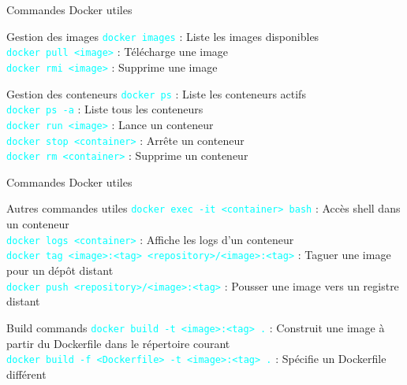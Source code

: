 \documentclass{beamer}
\begin{document}
\begin{frame}[fragile]{Commandes Docker utiles}
\begin{block}{Gestion des images}
\textcolor{cyan}{\verb?docker images?} : Liste les images disponibles \\
\textcolor{cyan}{\verb?docker pull <image>?} : Télécharge une image \\
\textcolor{cyan}{\verb?docker rmi <image>?} : Supprime une image
\end{block}

\begin{block}{Gestion des conteneurs}
\textcolor{cyan}{\verb?docker ps?} : Liste les conteneurs actifs \\
\textcolor{cyan}{\verb?docker ps -a?} : Liste tous les conteneurs \\
\textcolor{cyan}{\verb?docker run <image>?} : Lance un conteneur \\
\textcolor{cyan}{\verb?docker stop <container>?} : Arrête un conteneur \\
\textcolor{cyan}{\verb?docker rm <container>?} : Supprime un conteneur
\end{block}
\end{frame}


\begin{frame}[fragile]{Commandes Docker utiles}

\begin{block}{Autres commandes utiles}
\textcolor{cyan}{\verb?docker exec -it <container> bash?} : Accès shell dans un conteneur \\
\textcolor{cyan}{\verb?docker logs <container>?} : Affiche les logs d'un conteneur \\
\textcolor{cyan}{\verb?docker tag <image>:<tag> <repository>/<image>:<tag>?} : Taguer une image pour un dépôt distant \\
\textcolor{cyan}{\verb?docker push <repository>/<image>:<tag>?} : Pousser une image vers un registre distant \\
\end{block}


\begin{block}{Build commands}
\textcolor{cyan}{\verb?docker build -t <image>:<tag> .?} : Construit une image à partir du Dockerfile dans le répertoire courant \\
\textcolor{cyan}{\verb?docker build -f <Dockerfile> -t <image>:<tag> .?} : Spécifie un Dockerfile différent\\
\end{block}

\end{frame}
\end{document}
